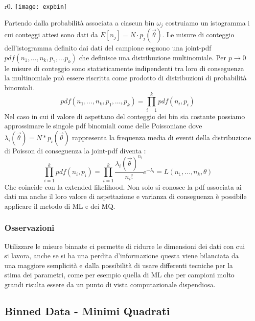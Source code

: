 \begin{wrapfigure}{r}{0.\textwidth}
\centering
\texttt{[image: expbin]}	
\end{wrapfigure}
Partendo dalla probabilit\`{a} associata a ciascun bin $\omega_j$ costruiamo un istogramma i cui conteggi attesi sono dati da $ E[n_{j}] = N \cdot p_j(\vec{\theta})$. Le misure di conteggio dell'istogramma definito dai dati del campione seguono una joint-pdf $pdf(n_1,...,n_k,p_1,...p_k)$ che definisce una distribuzione multinomiale. Per $p \rightarrow 0 $ le misure di conteggio sono statisticamente indipendenti tra loro di conseguenza la multinomiale pu\`{o} essere riscritta come prodotto di distribuzioni di probabilit\`{a} binomiali.
\begin{equation*}
	pdf(n_1,...,n_k,p_1,...,p_k) = \prod_{i=1}^kpdf(n_i,p_i)
\end{equation*}
Nel caso in cui il valore di aspettano del conteggio dei bin sia costante possiamo approssimare le singole pdf binomiali come delle Poissoniane dove $\lambda_{i}(\vec{\theta}) = N * p_i(\vec{\theta})$ rappresenta la frequenza media di eventi della distribuzione di Poisson di conseguenza la joint-pdf diventa :
\begin{equation*}
	\prod_{i=1}^kpdf(n_i,p_i) = \prod_{i=1}^k \dfrac{\lambda_i(\vec{\theta})^{n_{i}}}{n_{i}!}e^{-\lambda_{i}} = L(n_1,...,n_k,\theta)
\end{equation*}
Che coincide con la extended likelihood.\newline
Non solo si conosce la pdf associata ai dati ma anche il loro valore di aspettazione e varianza di conseguenza \`{e} possibile applicare il metodo di ML e dei MQ.
\subsubsection{Osservazioni}

Utilizzare le misure binnate ci permette di ridurre le dimensioni dei dati con cui si lavora, anche se si ha una perdita d'informazione questa viene bilanciata da una maggiore semplicit\`{a} e dalla possibilit\`{a} di usare differenti tecniche per la stima dei parametri, come per esempio quella di ML che per campioni molto grandi risulta essere da un punto di vista computazionale dispendiosa.

\subsection{Binned Data - Minimi Quadrati}

